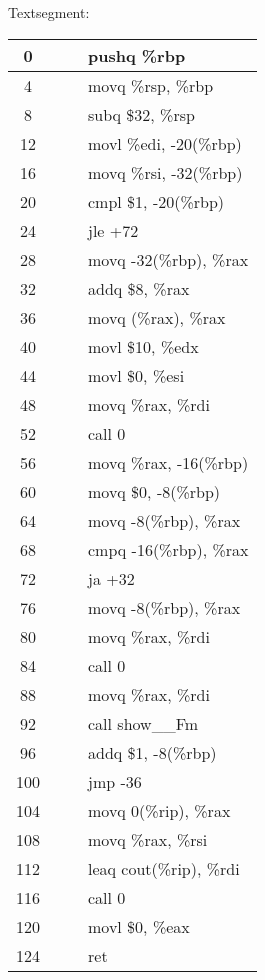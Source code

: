 \documentclass{ti2}
\begin{document}
Textsegment:
\begin{tabular}{|c|l l l|}
	\hline
	0 & & & pushq	\%rbp\\
	\hline
	4 & & & movq	\%rsp, \%rbp\\
	\hline
	8 & & & subq	\$32, \%rsp\\
	\hline
	12 & & & movl	\%edi, -20(\%rbp)\\
	\hline
	16 & & & movq	\%rsi, -32(\%rbp)\\
	\hline
	20 & & & cmpl	\$1, -20(\%rbp)\\
	\hline
	24 & & & jle	+72\\
	\hline
	28 & & & movq	-32(\%rbp), \%rax\\
	\hline
	32 & & & addq	\$8, \%rax\\
	\hline
	36 & & & movq	(\%rax), \%rax\\
	\hline
	40 & & & movl	\$10, \%edx\\
	\hline
	44 & & & movl	\$0, \%esi\\
	\hline
	48 & & & movq	\%rax, \%rdi \\
	\hline
	52 & & & call	0 \\
	\hline
	56 & & & movq	\%rax, -16(\%rbp)\\
	\hline
	60 & & & movq	\$0, -8(\%rbp) \\
	\hline
	64 & & & movq	-8(\%rbp), \%rax\\
	\hline
	68 & & & cmpq	-16(\%rbp), \%rax\\
	\hline
	72 & & & ja	+32\\
	\hline
	76 & & & movq	-8(\%rbp), \%rax\\
	\hline
	80 & & & movq	\%rax, \%rdi\\
	\hline
	84 & & & call	0\\
	\hline
	88 & & & movq	\%rax, \%rdi\\
	\hline
	92 & & & call	show\_\_Fm\\
	\hline
	96 & & & addq	\$1, -8(\%rbp)\\
	\hline
	100 & & & jmp	-36\\
	\hline
	104 & & & movq	0(\%rip), \%rax\\
	\hline
	108 & & & movq	\%rax, \%rsi\\
	\hline
	112 & & & leaq	cout(\%rip), \%rdi\\
	\hline
	116 & & & call	0\\
	\hline
	120 & & & movl	\$0, \%eax\\
	\hline
	124 & & & ret \\
	\hline
\end{tabular}\\ \\ \\ \\ \\
\end{document}
